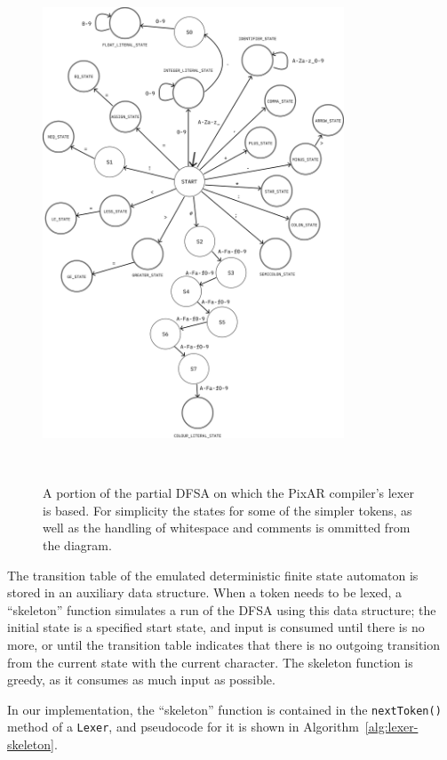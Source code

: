 \documentclass[11pt,a4paper]{scrartcl}
\begin{document}
\begin{figure}
  \centering
  \includegraphics[width=0.8\textwidth]{lexer_dfsa}
  \caption{A portion of the partial DFSA on which the PixAR compiler's lexer is based. For simplicity the states for some of the simpler tokens, as well as the handling of whitespace and comments is ommitted from the diagram.}~\label{fig:lexer-dfsa}
\end{figure}

The transition table of the emulated deterministic finite state automaton is stored in an auxiliary data structure. When a token needs to be lexed, a ``skeleton'' function simulates a run of the DFSA using this data structure; the initial state is a specified start state, and input is consumed until there is no more, or until the transition table indicates that there is no outgoing transition from the current state with the current character. The skeleton function is greedy, as it consumes as much input as possible.

In our implementation, the ``skeleton'' function is contained in the \verb|nextToken()| method of a \verb|Lexer|, and pseudocode for it is shown in Algorithm~\ref{alg:lexer-skeleton}.
\end{document}
